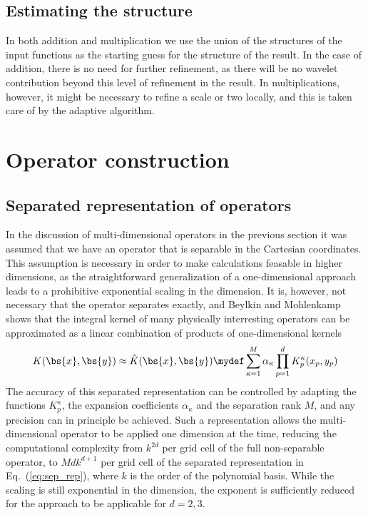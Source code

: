 \subsection{Estimating the \tree structure}
In both addition and multiplication we use the union of the \tree structures of
the input functions as the starting guess for the \tree structure of the result.
In the case of addition, there is no need for further refinement, as there will 
be no wavelet contribution beyond this level of refinement in the result. In 
multiplications, however, it might be necessary to refine a scale or two locally,
and this is taken care of by the adaptive algorithm.

\section{Operator construction}

\subsection{Separated representation of operators}
In the discussion of multi-dimensional operators in the previous section it
was assumed that we have an operator that is separable in the Cartesian
coordinates. This assumption is necessary in order to make calculations
feasable in higher dimensions, as the straightforward generalization of a
one-dimensional approach leads to a prohibitive exponential scaling in the 
dimension. It is,
however, not necessary that the operator separates exactly, and Beylkin 
and Mohlenkamp~\cite{Beylkin:2002p429,Beylkin:2005p45} shows that the integral 
kernel of many physically interresting operators can be approximated as a linear 
combination of products of one-dimensional kernels
\begin{equation}
    \label{eq:sep_rep}
    K(\bs{x},\bs{y}) \approx \hat{K}(\bs{x},\bs{y}) \mydef 
	\sum_{\kappa=1}^{M}\alpha_\kappa \prod_{p=1}^d K_p^\kappa(x_p,y_p)
\end{equation}
The accuracy of this separated representation can be controlled by adapting
the functions $K_p^\kappa$, the expansion coefficients $\alpha_\kappa$ and the 
separation rank $M$, and any precision can in principle be achieved. Such
a representation allows the multi-dimensional operator to be applied one 
dimension at the time, reducing the computational complexity from
$k^{2d}$ per grid cell of the full non-separable operator, to $Mdk^{d+1}$ 
per grid cell of the separated representation in Eq.~(\ref{eq:sep_rep}),
where $k$ is the order of the polynomial basis. While the scaling is still 
exponential in the dimension, the exponent is sufficiently reduced for the 
approach to be applicable for $d=2,3$. 

